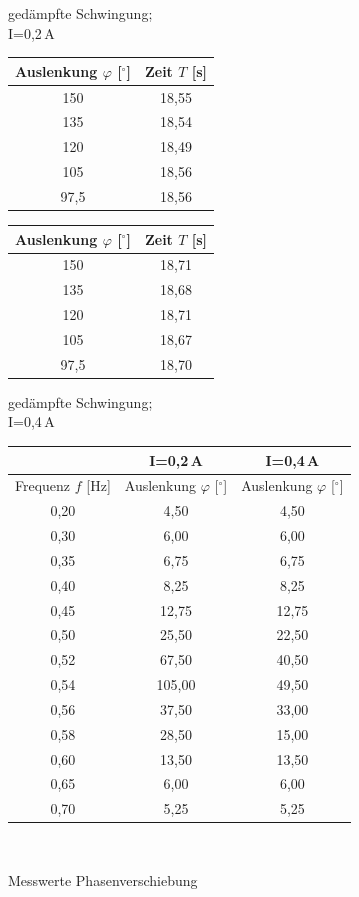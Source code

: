 \documentclass[fontsize=12pt]{scrartcl}
\begin{document}
\begin{figure}[H]
\centering
\begin{minipage}{0.45\textwidth}
\centering
\caption{gedämpfte Schwingung;\\ I=0,2\,A}
\begin{tabular}{|c|c|} \hline
Auslenkung $\varphi$ 	[$^{\circ}$] & Zeit $T$ [s]\\ \hline
150	&18,55\\ \hline
135	&18,54\\ \hline
120	&18,49\\ \hline
105	&18,56\\ \hline
97,5	&18,56\\ \hline
\end{tabular}	
\end{minipage}	
\begin{minipage}{0.45\textwidth}
\centering
\caption{gedämpfte Schwingung;\\ I=0,4\,A}
\begin{tabular}{|c|c|} \hline
Auslenkung $\varphi$ 	[$^{\circ}$] & Zeit $T$ [s]\\ \hline
150	&18,71\\ \hline
135	&18,68\\ \hline
120	&18,71\\ \hline
105	&18,67\\ \hline
97,5	&18,70\\ \hline
\end{tabular}	
\end{minipage}
\end{figure}
\begin{figure}[H]
\caption{Messwerte Phasenverschiebung}
\centering
\begin{tabular}{|c|c|c|} \hline
&I=0,2\,A&I=0,4\,A\\ \hline
Frequenz $f$ [Hz] & Auslenkung $\varphi$ 	[$^{\circ}$] &Auslenkung $\varphi$ 	[$^{\circ}$] \\ \hline
0,20	&4,50	&4,50\\ \hline
0,30	&6,00	&6,00\\ \hline
0,35	&6,75	&6,75\\ \hline
0,40	&8,25	&8,25\\ \hline
0,45	&12,75	&12,75\\ \hline
0,50	&25,50	&22,50\\ \hline
0,52	&67,50	&40,50\\ \hline
0,54	&105,00	&49,50\\ \hline
0,56	&37,50	&33,00\\ \hline
0,58	&28,50	&15,00\\ \hline
0,60	&13,50	&13,50\\ \hline
0,65	&6,00	&6,00\\ \hline
0,70	&5,25	&5,25\\ \hline
\end{tabular} \\
\end{figure}
\end{document}

